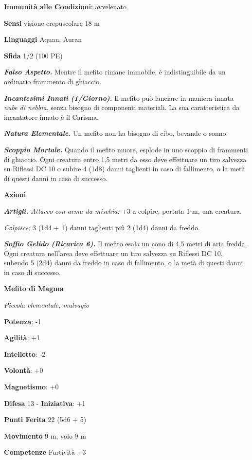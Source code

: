 \begin{multicols}{2}
\textbf{Immunità alle Condizioni}: avvelenato

\textbf{Sensi} visione crepuscolare 18 m

\textbf{Linguaggi} Aquan, Auran

\textbf{Sfida} 1/2 (100 PE)\smallskip

\emph{\textbf{Falso Aspetto.}} Mentre il mefito rimane immobile, è
indistinguibile da un ordinario frammento di ghiaccio.

\emph{\textbf{Incantesimi Innati (1/Giorno).}} Il mefito può lanciare in
maniera innata \emph{nube di nebbia}, senza bisogno di componenti
materiali. La sua caratteristica da incantatore innato è il Carisma.

\emph{\textbf{Natura Elementale.}} Un mefito non ha bisogno di cibo,
bevande o sonno.

\emph{\textbf{Scoppio Mortale.}} Quando il mefito muore, esplode in uno
scoppio di frammenti di ghiaccio. Ogni creatura entro 1,5 metri da esso
deve effettuare un tiro salvezza su Riflessi DC 10 o subire 4 (1d8)
danni taglienti in caso di fallimento, o la metà di questi danni in caso
di successo.

\smallskip\textbf{Azioni}

\emph{\textbf{Artigli.} Attacco con arma da mischia}: +3 a colpire,
portata 1 m, una creatura.

\emph{Colpisce:} 3 (1d4 + 1) danni taglienti più 2 (1d4) danni da
freddo.

\emph{\textbf{Soffio Gelido (Ricarica 6).}} Il mefito esala un cono di
4,5 metri di aria fredda. Ogni creatura nell'area deve effettuare un
tiro salvezza su Riflessi DC 10, subendo 5 (2d4) danni da freddo in
caso di fallimento, o la metà di questi danni in caso di successo.

\textbf{Mefito di Magma}

\emph{Piccola elementale, malvagio}

\textbf{Potenza}: -1

\textbf{Agilità}: +1

\textbf{Intelletto}: -2

\textbf{Volontà}: +0

\textbf{Magnetismo}: +0

\textbf{Difesa} 13 - \textbf{Iniziativa}: +1

\textbf{Punti Ferita} 22 (5d6 + 5)

\textbf{Movimento} 9 m, volo 9 m

\textbf{Competenze} Furtività +3


\end{multicols}
